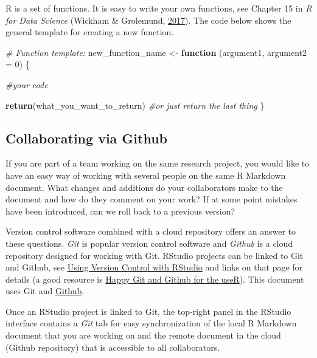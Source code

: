 \documentclass[doc,floatsintext]{apa6}
\newenvironment{Shaded}{\begin{snugshade}}{\end{snugshade}}
\newcommand{\KeywordTok}[1]{\textcolor[rgb]{0.13,0.29,0.53}{\textbf{#1}}}
\newcommand{\DataTypeTok}[1]{\textcolor[rgb]{0.13,0.29,0.53}{#1}}
\newcommand{\DecValTok}[1]{\textcolor[rgb]{0.00,0.00,0.81}{#1}}
\newcommand{\StringTok}[1]{\textcolor[rgb]{0.31,0.60,0.02}{#1}}
\newcommand{\CommentTok}[1]{\textcolor[rgb]{0.56,0.35,0.01}{\textit{#1}}}
\newcommand{\ControlFlowTok}[1]{\textcolor[rgb]{0.13,0.29,0.53}{\textbf{#1}}}
\newcommand{\NormalTok}[1]{#1}
\begin{document}
R is a set of functions. It is easy to write your own functions, see
Chapter 15 in \emph{R for Data Science} (Wickham \& Grolemund,
\protect\hyperlink{ref-WickhamDataScienceImport2017}{2017}). The code
below shows the general template for creating a new function.

\begin{Shaded}
\begin{Highlighting}[]
\CommentTok{# Function template:}
\NormalTok{new_function_name <-}\StringTok{ }\ControlFlowTok{function}\NormalTok{ (argument1, }\DataTypeTok{argument2 =} \DecValTok{0}\NormalTok{) \{}
  
  \CommentTok{#your code}
  
  \KeywordTok{return}\NormalTok{(what_you_want_to_return) }
  \CommentTok{#or just return the last thing}
\NormalTok{\}}
\end{Highlighting}
\end{Shaded}

\subsection{Collaborating via Github}\label{collaborating-via-github}

If you are part of a team working on the same research project, you
would like to have an easy way of working with several people on the
same R Markdown document. What changes and additions do your
collaborators make to the document and how do they comment on your work?
If at some point mistakes have been introduced, can we roll back to a
previous version?

Version control software combined with a cloud repository offers an
answer to these questions. \emph{Git} is popular version control
software and \emph{Github} is a cloud repository designed for working
with Git. RStudio projects can be linked to Git and Github, see
\href{https://support.rstudio.com/hc/en-us/articles/200532077}{Using
Version Control with RStudio} and links on that page for details (a good
resource is \href{http://happygitwithr.com/}{Happy Git and Github for
the useR}). This document uses Git and
\href{https://github.com/WdeNooy/Switch2R}{Github}.

Once an RStudio project is linked to Git, the top-right panel in the
RStudio interface contains a \emph{Git} tab for easy synchronization of
the local R Markdown document that you are working on and the remote
document in the cloud (Github repository) that is accessible to all
collaborators.
\end{document}
